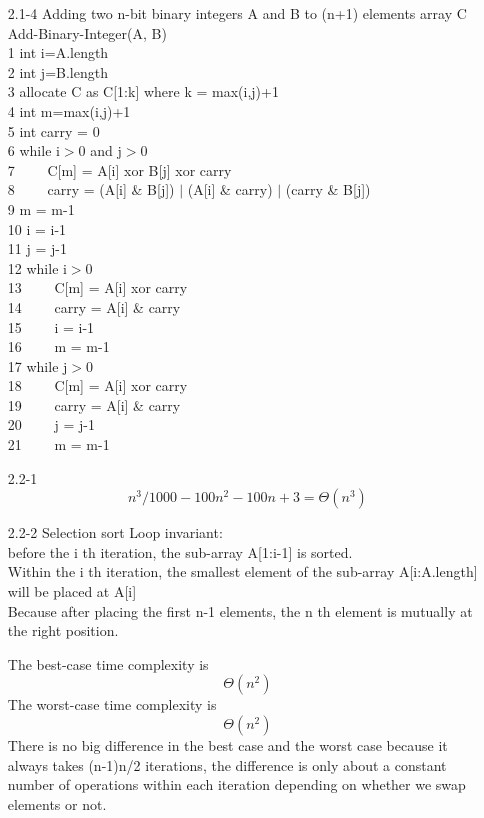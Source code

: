 \documentclass[]{article}
\begin{document}
\begin{enumerate}
\item[2.1-4] Adding two n-bit binary integers A and B to (n+1) elements array C\\

Add-Binary-Integer(A, B)\\
1 int i=A.length\\
2 int j=B.length\\
3 allocate C as C[1:k] where k = max(i,j)+1\\
4 int m=max(i,j)+1\\
5 int carry = 0\\
6 while i$>$0 and j$ > $0\\
7 \ \ \ \ C[m] = A[i] xor B[j] xor carry\\
8 \ \ \ \ carry = (A[i] \& B[j]) $|$ (A[i] \& carry) $|$ (carry \& B[j])\\
9  m = m-1\\
10 i = i-1\\
11 j = j-1\\
12 while i$>$0 \\
13 \ \ \ \ C[m] = A[i] xor carry\\
14 \ \ \ \ carry = A[i] \& carry\\
15 \ \ \ \ i = i-1\\
16 \ \ \ \ m = m-1\\
17 while j$>$0 \\
18 \ \ \ \ C[m] = A[i] xor carry\\
19 \ \ \ \ carry = A[i] \& carry\\
20 \ \ \ \ j = j-1\\
21 \ \ \ \ m = m-1\\

\item[2.2-1] $$ n^3/1000 - 100n^2 -100n +3 = \Theta(n^3) $$

\item[2.2-2] Selection sort Loop invariant:\\
 before the i th iteration, the sub-array A[1:i-1] is sorted.\\
Within the i th iteration, the smallest element of the sub-array A[i:A.length] will be placed at A[i]\\

\noindent
Because after placing the first n-1 elements, the n th element is mutually at the right position.

\noindent
The best-case time complexity is $$ \Theta(n^2) $$
The worst-case time complexity is $$ \Theta(n^2) $$
There is no big difference in the best case and the worst case because it always takes (n-1)n/2 iterations, the difference is only about a constant number of operations within each iteration depending on whether we swap elements or not.


\end{enumerate}
\end{document}
